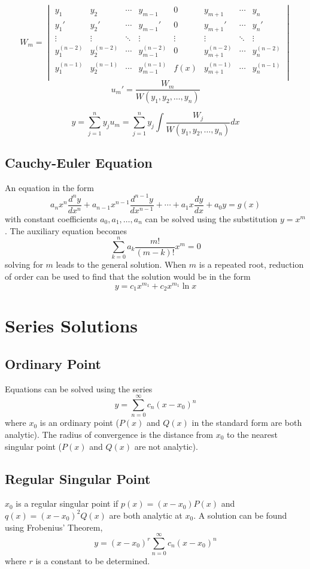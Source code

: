 \documentclass{article}
\begin{document}
$$W_m = \begin{vmatrix}
    y_1 & y_2 & \cdots & y_{m-1} & 0 & y_{m+1} & \cdots & y_{n} \\
    y_1 ' & y_2 '& \cdots & y_{m-1} '& 0 & y_{m+1} '& \cdots & y_{n} '\\
    \vdots & \vdots & \ddots & \vdots & \vdots & \vdots & \ddots & \vdots \\
    y_1 ^{(n-2)}& y_2 ^{(n-2)}& \cdots & y_{m-1} ^{(n-2)}& 0 & y_{m+1} ^{(n-2)}& \cdots & y_{n} ^{(n-2)} \\
    y_1 ^{(n-1)}& y_2 ^{(n-1)}& \cdots & y_{m-1} ^{(n-1)}& f(x) & y_{m+1} ^{(n-1)}& \cdots & y_{n} ^{(n-1)} \\
\end{vmatrix} $$
$$u_m ' = \frac{W_m}{W(y_1, y_2 ,\dots , y_n)}$$

$$y = \sum_{j=1} ^n y_j u_m  = \sum_{j=1} ^n y_j \int \frac{W_j}{W(y_1, y_2 ,\dots , y_n)} dx$$
\subsection{Cauchy-Euler Equation}
An equation in the form
$$a_n x^n \frac{d^n y}{d x^n} + a_{n-1} x^{n-1} \frac{d^{n-1} y}{d x^{n-1}} + \cdots + a_1 x \frac{dy}{dx} + a_0 y = g(x)$$
with constant coefficients $a_0, a_1 , \dots ,a_n$ can be solved using the substitution $y = x^m$. The auxiliary equation becomes
$$\sum_{k=0}^{n} a_k \frac{m!}{(m-k)!}x^m = 0$$
solving for $m$ leads to the general solution. When $m$ is a repeated root, reduction of order can be used to find that the solution would be in the form
$$y = c_1 x^{m_1} + c_2 x^{m_1}\ln x$$

\section{Series Solutions}
\subsection{Ordinary Point}
Equations can be solved using the series $$y = \sum_{n=0}^{\infty} c_n ( x - x_0 )^n$$where $x_0$ is an ordinary point ($P(x)$ and $Q(x)$ in the standard form are both analytic). The radius of convergence is the distance from $x_0$ to the nearest singular point ($P(x)$ and $Q(x)$ are not analytic).
\subsection{Regular Singular Point}
$x_0$ is a regular singular point if $p(x) = (x-x_0) P(x)$ and $q(x)= (x-x_0)^2 Q(x)$ are both analytic at $x_0$. A solution can be found using Frobenius' Theorem, 
$$y = (x-x_0)^r \sum^\infty _{n=0} c_n (x-x_0)^n $$
where $r$ is a constant to be determined. 
\end{document}
